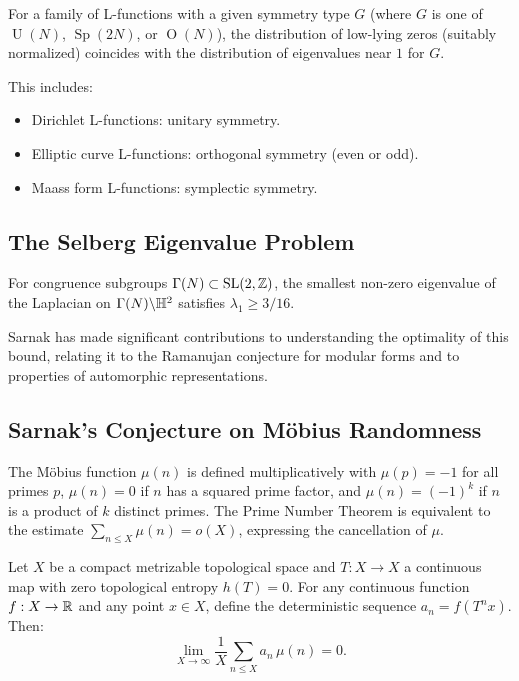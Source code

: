 \begin{theorem}
For a family of L-functions with a given symmetry type $G$ (where $G$ is one of $\operatorname{U}(N)$, $\operatorname{Sp}(2N)$, or $\operatorname{O}(N)$), the distribution of low-lying zeros (suitably normalized) coincides with the distribution of eigenvalues near $1$ for $G$.
\end{theorem}

This includes:
\begin{itemize}
    \item Dirichlet L-functions: unitary symmetry.
    \item Elliptic curve L-functions: orthogonal symmetry (even or odd).
    \item Maass form L-functions: symplectic symmetry.
\end{itemize}

\subsection{The Selberg Eigenvalue Problem}

\begin{theorem}[Selberg, 1965]
For congruence subgroups $\Gamma(N) \subset \operatorname{SL}(2,\mathbb{Z})$, the smallest non-zero eigenvalue of the Laplacian on $\Gamma(N) \backslash \mathbb{H}^2$ satisfies $\lambda_1 \geq 3/16$.
\end{theorem}

Sarnak has made significant contributions to understanding the optimality of this bound, relating it to the Ramanujan conjecture for modular forms and to properties of automorphic representations.

\subsection{Sarnak's Conjecture on M\"obius Randomness}

The M\"obius function $\mu(n)$ is defined multiplicatively with $\mu(p) = -1$ for all primes $p$, $\mu(n) = 0$ if $n$ has a squared prime factor, and $\mu(n) = (-1)^k$ if $n$ is a product of $k$ distinct primes. The Prime Number Theorem is equivalent to the estimate $\sum_{n \leq X} \mu(n) = o(X)$, expressing the cancellation of $\mu$.

\begin{conjecture}
Let $X$ be a compact metrizable topological space and $T: X \to X$ a continuous map with zero topological entropy $h(T) = 0$. For any continuous function $f: X \to \mathbb{R}$ and any point $x \in X$, define the deterministic sequence $a_n = f(T^n x)$. Then:
\[
\lim_{X \to \infty} \frac{1}{X} \sum_{n \leq X} a_n \, \mu(n) = 0.
\]
\end{conjecture}

